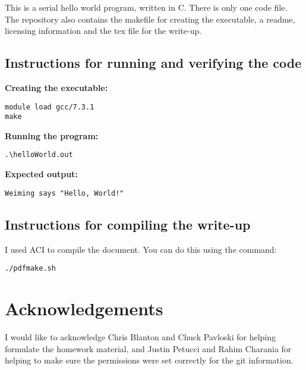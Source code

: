 \documentclass{article}
\begin{document}
\begin{spacing}{1.1}
This is a serial hello world program, written in C. There is only one code file. The repository also contains the makefile for creating the executable, a readme, licensing information and the tex file for the write-up.


\subsection{Instructions for running and verifying the code}

\textbf{Creating the executable:}
\begin{verbatim}
module load gcc/7.3.1
make
\end{verbatim}

\textbf{Running the program:}
\begin{verbatim}
.\helloWorld.out
\end{verbatim}

\textbf{Expected output:}
\begin{verbatim}
Weiming says "Hello, World!"
\end{verbatim}

\subsection{Instructions for compiling the write-up}

I used ACI to compile the document.  You can do this using the command:
\begin{verbatim}
./pdfmake.sh
\end{verbatim}

\section{Acknowledgements}

I would like to acknowledge Chris Blanton and Chuck Pavloski for helping formulate the homework material, and Justin Petucci and Rahim Charania for helping to make sure the permissions were set correctly for the git information.




\end{spacing}
\end{document}
